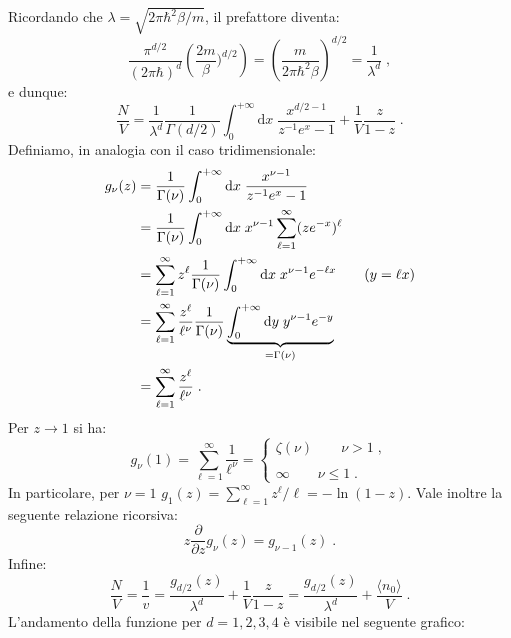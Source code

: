 \documentclass[10pt,a4paper]{report}
\theoremstyle{definition}
\numberwithin{equation}{section}
\newcommand{\diff}[1][]{\mathrm{d}#1}
\newcommand{\bra}{\langle}
\newcommand{\ket}{\rangle}
\begin{document}
Ricordando che $\lambda=\sqrt{2\pi\hbar^2\beta/m}$, il prefattore diventa:
$$
\frac{\pi^{d/2}}{(2\pi\hbar)^d}\left(\frac{2m}{\beta})^{d/2}\right)=\left(\frac{m}{2\pi\hbar^2\beta}\right)^{d/2}=\frac{1}{\lambda^d}\;,
$$
e dunque:
$$
\frac{N}{V}=\frac{1}{\lambda^d}\frac{1}{\Gamma(d/2)}\int_0^{+\infty}\diff{x}\;\frac{x^{d/2-1}}{z^{-1}e^x-1}+\frac{1}{V}\frac{z}{1-z}\;.
$$
Definiamo, in analogia con il caso tridimensionale:
\begin{align}
g_{\nu}(z) &= \frac{1}{\Gamma(\nu)}\int_0^{+\infty}\diff{x}\;\frac{x^{\nu-1}}{z^{-1}e^x-1} \\
&= \frac{1}{\Gamma(\nu)}\int_0^{+\infty}\diff{x}\;x^{\nu-1}\sum_{\ell=1}^{\infty}(ze^{-x})^{\ell} \notag \\
&= \sum_{\ell=1}^{\infty}z^{\ell}\frac{1}{\Gamma(\nu)}\int_0^{+\infty}\diff{x}\;x^{\nu-1}e^{-\ell x} \qquad (y=\ell x) \notag \\
&=\sum_{\ell=1}^{\infty}\frac{z^{\ell}}{\ell^{\nu}}\frac{1}{\Gamma(\nu)}\underbrace{\int_0^{+\infty}\diff{y}\;y^{\nu-1}e^{-y}}_{=\Gamma(\nu)} \notag \\
&= \sum_{\ell=1}^{\infty}\frac{z^{\ell}}{\ell^{\nu}}\;.
\end{align}
Per $z\to 1$ si ha:
\begin{equation}
g_{\nu}(1)=\sum_{\ell=1}^{\infty}\frac{1}{\ell^{\nu}}=\begin{cases}
\zeta(\nu)\qquad \nu>1\;, \\
\\
\infty \qquad \nu\le 1\;.
\end{cases}
\end{equation}
In particolare, per $\nu=1$ $g_1(z)=\sum_{\ell=1}^{\infty}z^{\ell}/\ell=-\ln(1-z)$. Vale inoltre la seguente relazione ricorsiva:
\begin{equation}
z\frac{\partial}{\partial z}g_{\nu}(z)=g_{\nu-1}(z)\;.
\end{equation}
Infine:
\begin{equation}
\frac{N}{V}=\frac{1}{v}=\frac{g_{d/2}(z)}{\lambda^d}+\frac{1}{V}\frac{z}{1-z}=\frac{g_{d/2}(z)}{\lambda^d}+\frac{\bra n_0\ket}{V}\;.
\end{equation}
L'andamento della funzione per $d=1,2,3,4$ è visibile nel seguente grafico:
\end{document}

